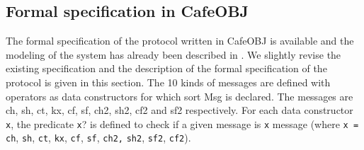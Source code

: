 \documentclass[a4paper,fleqn]{cas-dc}
\begin{document}
\subsection{Formal specification in CafeOBJ} \label{fstls}
The formal specification of the protocol written in CafeOBJ is available and the modeling of the system has already been described in \cite{ogata05}. We slightly revise the existing specification and the description of the formal specification of the protocol is given in this section. 
The 10 kinds of messages are defined with operators as data constructors for which sort Msg is declared. The messages are ch, sh, ct, kx, cf, sf, ch2, sh2, cf2 and sf2 respectively.
For each data constructor \verb!x!, the predicate \verb!x!? is defined to check if a given message is \verb!x! message (where \verb!x = ch!, \verb!sh!, \verb!ct!, \verb!kx!, \verb!cf!, \verb!sf!, \verb!ch2,! \verb!sh2!, \verb!sf2!, \verb!cf2!).
\end{document}
